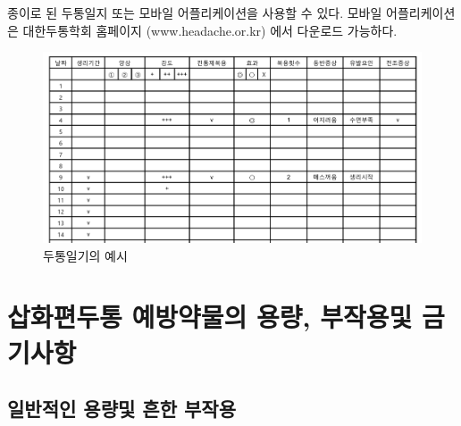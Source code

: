 \documentclass[]{book}
\begin{document}
종이로 된 두통일지 또는 모바일 어플리케이션을 사용할 수 있다. 모바일 어플리케이션은 대한두통학회 홈페이지 (www.headache.or.kr) 에서 다운로드 가능하다.

\begin{figure}
\centering
\includegraphics{static/DiaryExample.png}
\caption{두통일기의 예시}
\end{figure}

\hypertarget{section-23}{%
\chapter{삽화편두통 예방약물의 용량, 부작용및 금기사항}\label{section-23}}

\hypertarget{section-24}{%
\section{일반적인 용량및 흔한 부작용}\label{section-24}}
\end{document}

